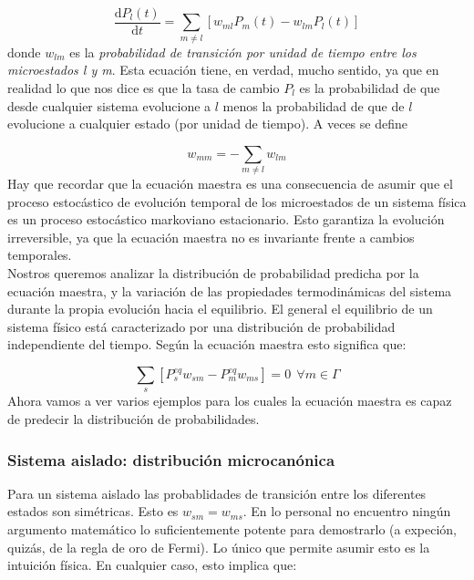 \documentclass[12pt,a4paper]{article}
\numberwithin{equation}{section}
\numberwithin{figure}{section}
\newcommand{\ccorchetes}[1]{\left[ #1  \right]}
\newcommand{\D}{\mathrm{d}}
\newcommand{\derivadas}[2]{\frac{\D #1}{\D #2}}
\theoremstyle{definition}
\begin{document}
\begin{equation}
\derivadas{P_l(t)}{t} = \sum_{m \neq l} \ccorchetes{w_{ml} P_m (t) - w_{lm} P_l (t)} 
\end{equation}
donde $w_{lm}$ es la \textit{probabilidad de transición por unidad de tiempo entre los microestados l y m}. Esta ecuación tiene, en verdad, mucho sentido, ya que en realidad lo que nos dice es que la tasa de cambio $P_l$ es la probabilidad de que desde cualquier sistema evolucione a $l$ menos la probabilidad de que de $l$ evolucione a cualquier estado (por unidad de tiempo). A veces se define

\begin{equation}
w_{mm} = - \sum_{m\neq l} w_{lm}
\end{equation}
Hay que recordar que la ecuación maestra es una consecuencia de asumir que el proceso estocástico de evolución temporal de los microestados de un sistema física es un proceso estocástico markoviano estacionario. Esto garantiza la evolución irreversible, ya que la ecuación maestra no es invariante frente a cambios temporales. \\

Nostros queremos analizar la distribución de probabilidad predicha por la ecuación maestra, y la variación de las propiedades termodinámicas del sistema durante la propia evolución hacia el equilibrio. El general el equilibrio de un sistema físico está caracterizado por una distribución de probabilidad independiente del tiempo. Según la ecuación maestra esto significa que:

\begin{equation}
\sum_s \ccorchetes{ P_s^{eq} w_{sm} - P_m^{eq} w_{ms}} = 0 \ \ \forall m \in \Gamma
\end{equation}
Ahora vamos a ver varios ejemplos para los cuales la ecuación maestra es capaz de predecir la distribución de probabilidades.


\subsubsection{Sistema aislado: distribución microcanónica}

Para un sistema aislado las probablidades de transición entre los diferentes estados son simétricas. Esto es $w_{sm}=w_{ms}$. En lo personal no encuentro ningún argumento matemático lo suficientemente potente para demostrarlo (a expeción, quizás, de la regla de oro de Fermi). Lo único que permite asumir esto es la intuición física. En cualquier caso, esto implica que:
\end{document}
